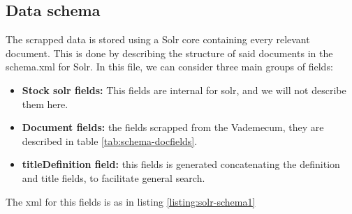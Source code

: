 


\subsection{Data schema}
\label{subsec:solrschema}

The scrapped data is stored using a Solr core containing every relevant document. This is done by describing the structure of said documents in the schema.xml for Solr. In this file, we can consider three main groups of fields:

\begin{itemize}
 \item \textbf{Stock solr fields: } This fields are internal for solr, and we will not describe them here.
 \item \textbf{Document fields: } the fields scrapped from the Vademecum, they are described in table \ref{tab:schema-docfields}.
 \item \textbf{titleDefinition field: } this fields is generated concatenating the definition and title fields, to facilitate general search. %
\end{itemize}

The xml for this fields is as in listing \ref{listing:solr-schema1}
\begin{center}
  
\end{center}

